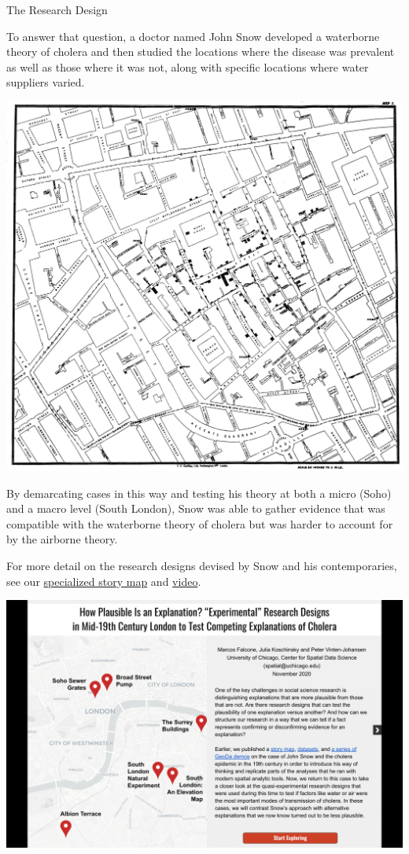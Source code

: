 \documentclass[
]{book}
\begin{document}
The Research Design

To answer that question, a doctor named John Snow developed a waterborne theory of cholera and then studied the locations where the disease was prevalent as well as those where it was not, along with specific locations where water suppliers varied.

\includegraphics{images/snow3.jpg}

By demarcating cases in this way and testing his theory at both a micro (Soho) and a macro level (South London), Snow was able to gather evidence that was compatible with the waterborne theory of cholera but was harder to account for by the airborne theory.

For more detail on the research designs devised by Snow and his contemporaries, see our \href{https://docs.google.com/presentation/d/e/2PACX-1vTpkyf_CSeAgD8datvssFfNHHwypUEYIg-tAC-cNaj6Nu_wrqqIOdsT_Y4phZYl8EBJA_OyWvrFhJfV/pub?start=false\&loop=false\&delayms=3000\&slide=id.g9d798a6fd3_0_81}{specialized story map} and \href{https://youtu.be/wClwk94IkLY}{video}.

\includegraphics{images/snow4.png}
\end{document}
